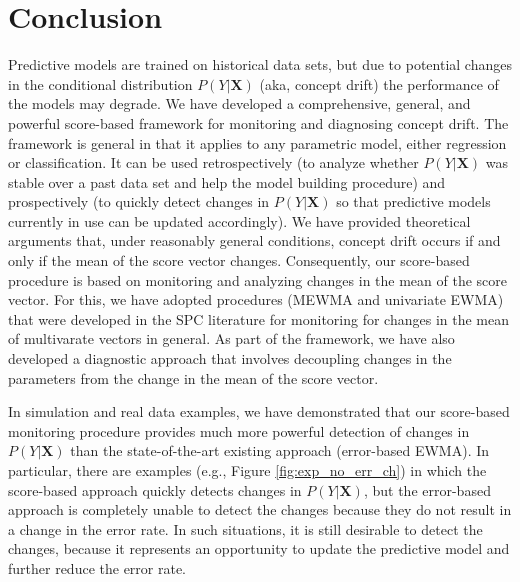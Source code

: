 \documentclass[twoside,11pt]{article}
\begin{document}
\section{Conclusion}
Predictive models are trained on historical data sets, but due to potential changes in the conditional distribution $P (Y|\bm {X})$ (aka, concept drift) the performance of the models may degrade. We have developed a comprehensive, general, and powerful score-based framework for monitoring and diagnosing concept drift. The framework is general in that it applies to any parametric model, either regression or classification. It can be used retrospectively (to analyze whether $P (Y|\bm {X})$ was stable over a past data set and help the model building procedure) and prospectively (to quickly detect changes in $P (Y|\bm {X})$ so that predictive models currently in use can be updated accordingly). We have provided theoretical arguments that, under reasonably general conditions, concept drift occurs if and only if the mean of the score vector changes. Consequently, our score-based procedure is based on monitoring and analyzing changes in the mean of the score vector. For this, we have adopted procedures (MEWMA and univariate EWMA) that were developed in the SPC literature for monitoring for changes in the mean of multivarate vectors in general. As part of the framework, we have also developed a diagnostic approach that involves decoupling changes in the parameters from the change in the mean of the score vector. 

In simulation and real data examples, we have demonstrated that our score-based monitoring procedure provides much more powerful detection of changes in $P (Y|\bm {X})$ than the state-of-the-art existing approach (error-based EWMA). In particular, there are examples (e.g., Figure \ref{fig:exp_no_err_ch}) in which the score-based approach quickly detects changes in $P (Y|\bm {X})$, but the error-based approach is completely unable to detect the changes because they do not result in a change in the error rate. In such situations, it is still desirable to detect the changes, because it represents an opportunity to update the predictive model and further reduce the error rate. 

\acks{}

\end{document}
